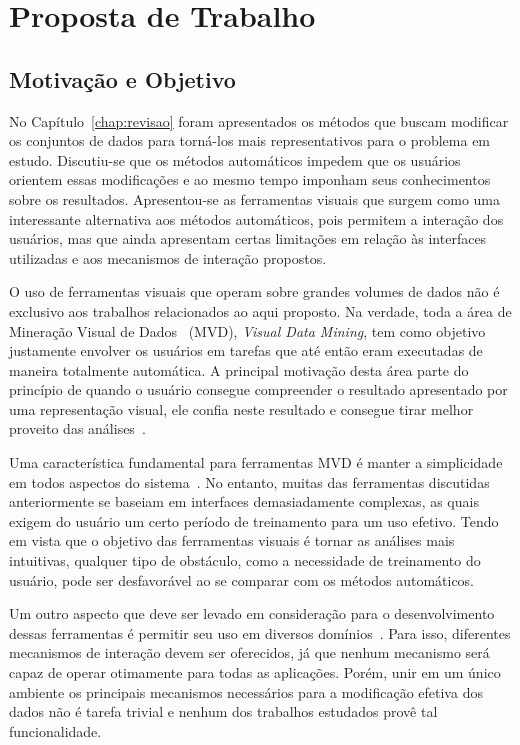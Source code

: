 \chapter{Proposta de Trabalho}\label{chap:proposta}

\section{Motivação e Objetivo}

No Capítulo~\ref{chap:revisao} foram apresentados os métodos
que buscam modificar os conjuntos de dados para torná-los
mais representativos para o problema em estudo.  Discutiu-se
que os métodos automáticos impedem que os usuários orientem
essas modificações e ao mesmo tempo imponham seus
conhecimentos sobre os resultados.  Apresentou-se as
ferramentas visuais que surgem como uma interessante
alternativa aos métodos automáticos, pois permitem a
interação dos usuários, mas que ainda apresentam certas
limitações em relação às interfaces utilizadas e aos
mecanismos de interação propostos.

O uso de ferramentas visuais que operam sobre grandes
volumes de dados não é exclusivo aos trabalhos relacionados
ao aqui proposto. Na verdade, toda a área de
Mineração Visual de Dados~\cite{Wong1999} (MVD),
\emph{Visual Data Mining}, tem como objetivo justamente
envolver os usuários em tarefas que até então eram
executadas de maneira totalmente automática. A principal
motivação desta área parte do princípio de quando o usuário
consegue compreender o resultado apresentado por uma
representação visual, ele confia neste resultado e
consegue tirar melhor proveito das análises~\cite{Wong1999}.

Uma característica fundamental para ferramentas MVD é manter
a simplicidade em todos aspectos do sistema~\cite{Wong1999}.
No entanto, muitas das ferramentas discutidas anteriormente
se baseiam em interfaces demasiadamente complexas, as quais
exigem do usuário um certo período de treinamento para um
uso efetivo. Tendo em vista que o objetivo das ferramentas
visuais é tornar as análises mais intuitivas, qualquer tipo
de obstáculo, como a necessidade de treinamento do usuário,
pode ser desfavorável ao se comparar com os métodos
automáticos.

Um outro aspecto que deve ser levado em consideração para o
desenvolvimento dessas ferramentas é permitir seu uso em
diversos domínios~\cite{Wong1999}. Para isso, diferentes
mecanismos de interação devem ser oferecidos, já que nenhum
mecanismo será capaz de operar otimamente para todas as
aplicações. Porém, unir em um único ambiente os principais
mecanismos necessários para a modificação efetiva dos dados
não é tarefa trivial e nenhum dos trabalhos estudados provê
tal funcionalidade.

